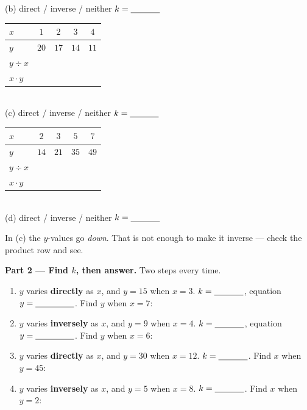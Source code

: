 \documentclass[10pt]{article}
\begin{document}
\begin{tcolorbox}[colback=white, colframe=black!40, title=\textbf{Tier R --- Remediate},
    fonttitle=\bfseries, arc=1.5mm, left=3mm, right=3mm, top=2mm, bottom=2mm, breakable]
\begin{center}
\begin{minipage}{0.47\linewidth}
{\small (b) \; direct \; / \; inverse \; / \; neither \quad $k=\blank{1.2cm}$}
\end{minipage}
\end{center}
\vspace{4pt}
\begin{center}
\begin{minipage}{0.47\linewidth}\centering
\renewcommand{\arraystretch}{1.25}
\begin{tabular}{|l|c|c|c|c|}
\hline
\rowcolor{forestbg}
$x$ & $1$ & $2$ & $3$ & $4$ \\ \hline
$y$ & $20$ & $17$ & $14$ & $11$ \\ \hline
$y\div x$ & & & & \\ \hline
$x\cdot y$ & & & & \\ \hline
\end{tabular}\\[2pt]
{\small (c) \; direct \; / \; inverse \; / \; neither \quad $k=\blank{1.2cm}$}
\end{minipage}\hfill
\begin{minipage}{0.47\linewidth}\centering
\renewcommand{\arraystretch}{1.25}
\begin{tabular}{|l|c|c|c|c|}
\hline
\rowcolor{forestbg}
$x$ & $2$ & $3$ & $5$ & $7$ \\ \hline
$y$ & $14$ & $21$ & $35$ & $49$ \\ \hline
$y\div x$ & & & & \\ \hline
$x\cdot y$ & & & & \\ \hline
\end{tabular}\\[2pt]
{\small (d) \; direct \; / \; inverse \; / \; neither \quad $k=\blank{1.2cm}$}
\end{minipage}
\end{center}
\vspace{2pt}
{\small In (c) the $y$-values go \emph{down}. That is not enough to make it inverse --- check the
product row and see.}

\vspace{5pt}
\textbf{Part 2 --- Find $k$, then answer.} Two steps every time.
\begin{enumerate}[label=(\alph*), leftmargin=2.1em, itemsep=5pt]
  \item $y$ varies \textbf{directly} as $x$, and $y=15$ when $x=3$. \; $k=\blank{1.2cm}$,
        equation $y=\blank{1.6cm}$. \; Find $y$ when $x=7$: \blank{1.4cm}
  \item $y$ varies \textbf{inversely} as $x$, and $y=9$ when $x=4$. \; $k=\blank{1.2cm}$,
        equation $y=\blank{1.6cm}$. \; Find $y$ when $x=6$: \blank{1.4cm}
  \item $y$ varies \textbf{directly} as $x$, and $y=30$ when $x=12$. \; $k=\blank{1.2cm}$. \;
        Find $x$ when $y=45$: \blank{1.4cm}
  \item $y$ varies \textbf{inversely} as $x$, and $y=5$ when $x=8$. \; $k=\blank{1.2cm}$. \;
        Find $x$ when $y=2$: \blank{1.4cm}
\end{enumerate}


\end{tcolorbox}
\end{document}
